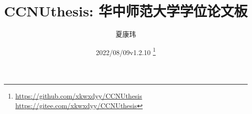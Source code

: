 \usepackage{multirow, xeCJKfntef, xpinyin}
\usepackage{graphicx}
\usepackage{tabularray}
\usepackage[
  backend = biber,
  style = gb7714-2015
]{biblatex}

\graphicspath{{figures}}

\def\FSID{“{\xeCJKsetup{PunctStyle=banjiao}。}”} %
\def\FSFW{“{\xeCJKsetup{PunctStyle=banjiao}．}”} %
\def\COFW{“{\xeCJKsetup{PunctStyle=banjiao}：}”} %
\def\SCFW{“{\xeCJKsetup{PunctStyle=banjiao}；}”} %


\title{\textcolor{MaterialIndigo800}{%
  \textbf{CCNUthesis: 华中师范大学学位论文板}}}
\author{夏康玮}
\date{2022/08/09\quad v1.2.10%
  \thanks{%
    \parbox{0.5\textwidth}{
      \url{https://github.com/xkwxdyy/CCNUthesis} \\
      \url{https://gitee.com/xkwxdyy/CCNUthesis}
    }
  }
}